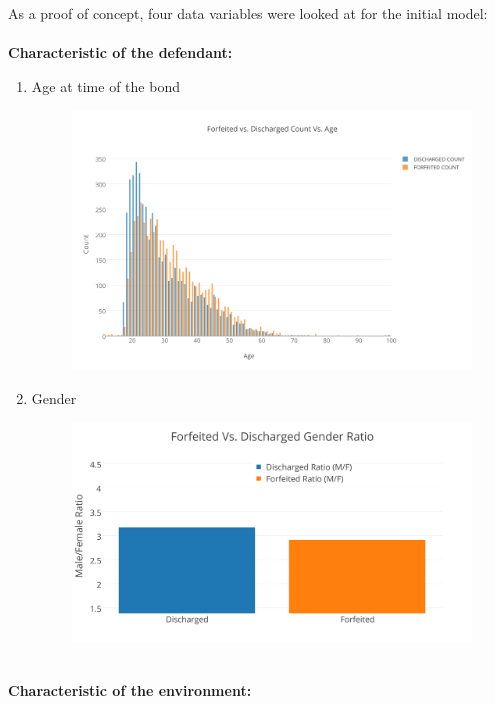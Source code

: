 \documentclass{article}
\begin{document}
As a proof of concept, four data variables were looked at for the initial model: \\
~\\
\textbf{Characteristic of the defendant:}
~\\ 
\begin{enumerate}
\item Age at time of the bond
\begin{figure}[H]
\centering
\includegraphics[width=0.5\paperwidth]{Forfeited_vs_Discharged_Count_Vs_Age.png}
\end{figure}

\item Gender
\begin{figure}[H]
\centering
\includegraphics[width=0.5\paperwidth]{Forfeited_vs_Discharged_Gender.png}
\end{figure}

\end{enumerate}
~\\
\textbf{Characteristic of the environment:}
~\\
\end{document}
